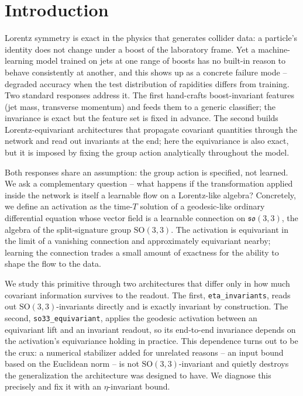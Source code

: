 \documentclass[11pt]{article}
\begin{document}
\section{Introduction}
\label{sec:intro}

Lorentz symmetry is exact in the physics that generates collider data: a
particle's identity does not change under a boost of the laboratory
frame. Yet a machine-learning model trained on jets at one range of
boosts has no built-in reason to behave consistently at another, and
this shows up as a concrete failure mode -- degraded accuracy when the
test distribution of rapidities differs from training. Two standard
responses address it. The first hand-crafts boost-invariant features
(jet mass, transverse momentum) and feeds them to a generic
classifier; the invariance is exact but the feature set is fixed in
advance. The second builds Lorentz-equivariant architectures
\citep{bogatskiy2020lgn, gong2022lorentznet, bogatskiy2022pelican} that
propagate covariant quantities through the network and read out
invariants at the end; here the equivariance is also exact, but it is
imposed by fixing the group action analytically throughout the model.

Both responses share an assumption: the group action is specified, not
learned. We ask a complementary question -- what happens if the
transformation applied inside the network is itself a learnable flow on
a Lorentz-like algebra? Concretely, we define an activation as the
time-$T$ solution of a geodesic-like ordinary differential equation
whose vector field is a learnable connection on $\mathfrak{so}(3,3)$,
the algebra of the split-signature group $\mathrm{SO}(3,3)$. The
activation is equivariant in the limit of a vanishing connection and
approximately equivariant nearby; learning the connection trades a small
amount of exactness for the ability to shape the flow to the data.

We study this primitive through two architectures that differ only in
how much covariant information survives to the readout. The first,
\texttt{eta\_invariants}, reads out $\mathrm{SO}(3,3)$-invariants
directly and is exactly invariant by construction. The second,
\texttt{so33\_equivariant}, applies the geodesic activation between an
equivariant lift and an invariant readout, so its end-to-end invariance
depends on the activation's equivariance holding in practice. This
dependence turns out to be the crux: a numerical stabilizer added for
unrelated reasons -- an input bound based on the Euclidean norm -- is
not $\mathrm{SO}(3,3)$-invariant and quietly destroys the
generalization the architecture was designed to have. We diagnose this
precisely and fix it with an $\eta$-invariant bound.
\end{document}
